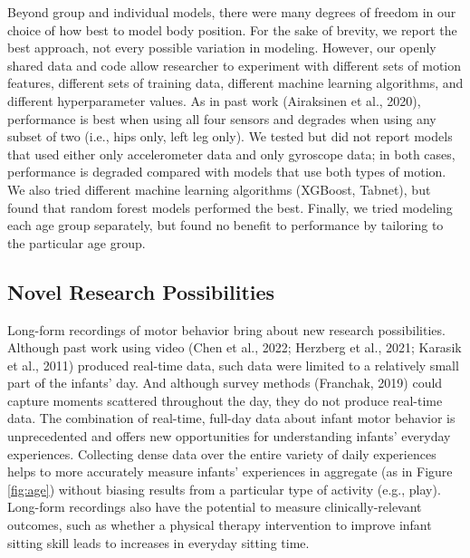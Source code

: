 \documentclass[
  man]{apa6}
\begin{document}
Beyond group and individual models, there were many degrees of freedom in our choice of how best to model body position. For the sake of brevity, we report the best approach, not every possible variation in modeling. However, our openly shared data and code allow researcher to experiment with different sets of motion features, different sets of training data, different machine learning algorithms, and different hyperparameter values. As in past work (Airaksinen et al., 2020), performance is best when using all four sensors and degrades when using any subset of two (i.e., hips only, left leg only). We tested but did not report models that used either only accelerometer data and only gyroscope data; in both cases, performance is degraded compared with models that use both types of motion. We also tried different machine learning algorithms (XGBoost, Tabnet), but found that random forest models performed the best. Finally, we tried modeling each age group separately, but found no benefit to performance by tailoring to the particular age group.

\hypertarget{novel-research-possibilities}{%
\subsection{Novel Research Possibilities}\label{novel-research-possibilities}}

Long-form recordings of motor behavior bring about new research possibilities. Although past work using video (Chen et al., 2022; Herzberg et al., 2021; Karasik et al., 2011) produced real-time data, such data were limited to a relatively small part of the infants' day. And although survey methods (Franchak, 2019) could capture moments scattered throughout the day, they do not produce real-time data. The combination of real-time, full-day data about infant motor behavior is unprecedented and offers new opportunities for understanding infants' everyday experiences. Collecting dense data over the entire variety of daily experiences helps to more accurately measure infants' experiences in aggregate (as in Figure \ref{fig:age}) without biasing results from a particular type of activity (e.g., play). Long-form recordings also have the potential to measure clinically-relevant outcomes, such as whether a physical therapy intervention to improve infant sitting skill leads to increases in everyday sitting time.
\end{document}
